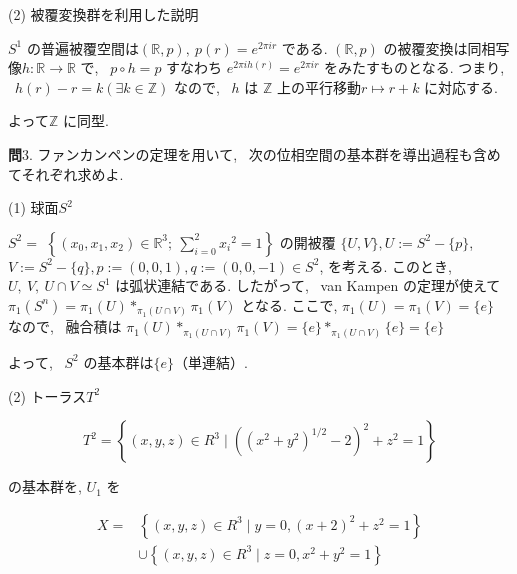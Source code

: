 \documentclass[10pt]{jsarticle}
\begin{document}
\bigskip
\bigskip

(2) 被覆変換群を利用した説明

$S^1$ の普遍被覆空間は$(\mathbb{R}, p), \ p(r) = e^{2\pi ir}$ である. $(\mathbb{R}, p)$ の被覆変換は同相写像$h : \mathbb{R} \to \mathbb{R}$ で, \ $p \circ h = p$ すなわち $e^{2\pi ih(r)} = e^{2\pi ir}$ をみたすものとなる. つまり, \ $h(r) - r = k (\exists k \in \mathbb{Z})$ なので, \ $h$ は $\mathbb{Z}$ 上の平行移動$r \mapsto r + k$ に対応する. 

よって$\mathbb{Z}$ に同型.

\bigskip
\bigskip

{\bf 問$3$}. ファンカンペンの定理を用いて, \ 次の位相空間の基本群を導出過程も含めてそれぞれ求めよ.

(1) 球面$S^2$

$S^{2}=$ $\left\{\left(x_{0}, x_{1}, x_{2}\right) \in \mathbb{R}^{3} ; \ \sum_{i=0}^{2} x_{i}{ }^{2}=1\right\}$ の開被覆 $\{U, V\}, U:=S^{2}-\{p\}$, $V:=S^{2}-\{q\}, p:=(0,0,1), q:=(0, 0,-1) \in S^{2}$, を考える. このとき, \  $U, \ V, \ U \cap V \simeq S^{1}$ は弧状連結である. したがって, \ van Kampen の定理が使えて $\pi_{1}\left(S^{n}\right)=\pi_{1}(U) *_{\pi_{1}(U \cap V)} \pi_{1}(V)$ となる. ここで, $\pi_{1}(U)=\pi_{1}(V) = \{e\}$ なので, \ 融合積は
$\pi_{1}(U) *_{\pi_{1}(U \cap V)} \pi_{1}(V)
= \{e\} *_{\pi_{1}(U \cap V)} \{e\}
= \{e\}$

よって, \ $S^2$ の基本群は$\{e\}$（単連結）.

\bigskip
\bigskip

(2) トーラス$T^2$

$$
T^{2}=\left\{(x, y, z) \in R^{3} \mid\left(\left(x^{2}+y^{2}\right)^{1 / 2}-2\right)^{2}+z^{2}=1\right\}
$$

の基本群を, $U_{1}$ を

$$
\begin{aligned}
X= & \left\{(x, y, z) \in R^{3} \mid y=0,(x+2)^{2}+z^{2}=1\right\} \\
& \cup\left\{(x, y, z) \in R^{3} \mid z=0, x^{2}+y^{2}=1\right\}
\end{aligned}
$$
\end{document}
